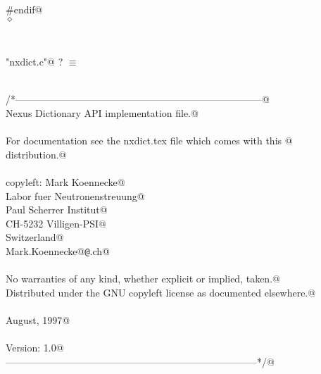 \documentclass[12pt]{article}
\begin{document}
{\begin{flushleft}
\begin{minipage}{\linewidth}
\begin{list}{}{}
\mbox{}\verb@#endif@\\
\mbox{}\verb@@$\diamond$
\end{list}
\vspace{-2ex}
\end{minipage}\\[4ex]
\end{flushleft}
\begin{flushleft} \small
\begin{minipage}{\linewidth} \label{scrap42}
\verb@"nxdict.c"@ {\footnotesize ? }$\equiv$
\vspace{-1ex}
\begin{list}{}{} \item
\mbox{}\verb@@\\
\mbox{}\verb@/*---------------------------------------------------------------------------@\\
\mbox{}\verb@                 Nexus Dictionary API implementation file.@\\
\mbox{}\verb@@\\
\mbox{}\verb@  For documentation see the nxdict.tex file which comes with this @\\
\mbox{}\verb@  distribution.@\\
\mbox{}\verb@@\\
\mbox{}\verb@  copyleft: Mark Koennecke@\\
\mbox{}\verb@            Labor fuer Neutronenstreuung@\\
\mbox{}\verb@            Paul Scherrer Institut@\\
\mbox{}\verb@            CH-5232 Villigen-PSI@\\
\mbox{}\verb@            Switzerland@\\
\mbox{}\verb@            Mark.Koennecke@{\tt @}\verb@psi.ch@\\
\mbox{}\verb@@\\
\mbox{}\verb@  No warranties of any kind, whether explicit or implied, taken.@\\
\mbox{}\verb@  Distributed under the GNU copyleft license as documented elsewhere.@\\
\mbox{}\verb@@\\
\mbox{}\verb@  August, 1997@\\
\mbox{}\verb@@\\
\mbox{}\verb@  Version: 1.0@\\
\mbox{}\verb@-----------------------------------------------------------------------------*/@\\
\mbox{}\verb@@\\

\end{list}
\end{minipage}
\end{flushleft}}
\end{document}
